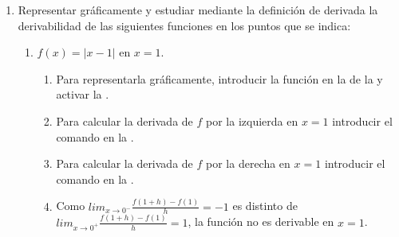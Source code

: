\begin{enumerate}[leftmargin=*]
% 


\item Representar gráficamente y estudiar mediante la definición de derivada la derivabilidad de las siguientes funciones en los puntos que se indica:
      \begin{enumerate}
      \item $f(x)=|x-1|$ en $x=1$.

            \begin{indication}
            \begin{enumerate}
            \item Para representarla gráficamente, introducir la función  en la  de la  y activar la .
            \item Para calcular la derivada de $f$ por la izquierda en $x=1$ introducir el comando  en la .
            \item Para calcular la derivada de $f$ por la derecha en $x=1$ introducir el comando  en la .
            \item Como $lim_{x\rightarrow 0^-}\frac{f(1+h)-f(1)}{h}=-1$ es distinto de $lim_{x\rightarrow 0^+}\frac{f(1+h)-f(1)}{h}=1$, la función no es derivable en $x=1$.
            \end{enumerate}
            \end{indication}


\end{enumerate}
\end{enumerate}
